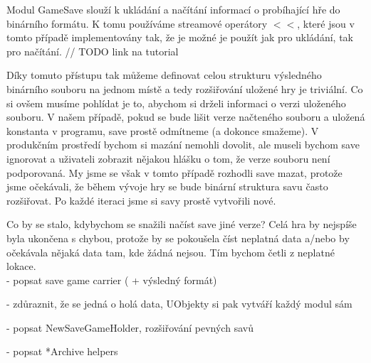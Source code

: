 
Modul GameSave slouží  k ukládání a načítání informací o probíhající hře do binárního formátu. K tomu používáme streamové operátory $<<$, které jsou v tomto případě implementovány tak, že je možné je použít jak pro ukládání, tak pro načítání. // TODO link na tutorial

Díky tomuto přístupu tak můžeme definovat celou strukturu výsledného binárního souboru na jednom místě a tedy rozšiřování uložené hry je triviální. Co si ovšem musíme pohlídat je to, abychom si drželi informaci o verzi uloženého souboru. V našem případě, pokud se bude lišit verze načteného souboru a uložená konstanta v programu, save prostě odmítneme (a dokonce smažeme). V produkčním prostředí bychom si mazání nemohli dovolit, ale museli bychom save ignorovat a uživateli zobrazit nějakou hlášku o tom, že verze souboru není podporovaná. My jsme se však v tomto případě rozhodli save mazat, protože jsme očekávali, že během vývoje hry se bude binární struktura savu často rozšiřovat. Po každé iteraci jsme si savy prostě vytvořili nové.

Co by se stalo, kdybychom se snažili načíst save jiné verze? Celá hra by nejspíše byla ukončena s chybou, protože by se pokoušela číst neplatná data a/nebo by očekávala nějaká data tam, kde žádná nejsou. Tím bychom četli z neplatné lokace.\\


- popsat save game carrier ( + výsledný formát)

- zdůraznit, že se jedná o holá data, UObjekty si pak vytváří každý modul sám

- popsat NewSaveGameHolder, rozšiřování pevných savů 

- popsat *Archive helpers 